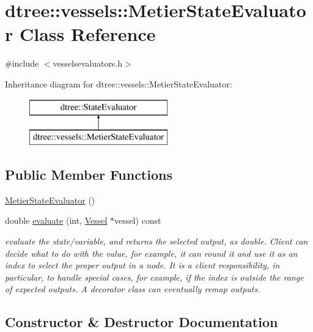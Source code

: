 \hypertarget{classdtree_1_1vessels_1_1_metier_state_evaluator}{}\section{dtree\+::vessels\+::Metier\+State\+Evaluator Class Reference}
\label{classdtree_1_1vessels_1_1_metier_state_evaluator}


{\ttfamily \#include $<$vesselsevaluators.\+h$>$}

Inheritance diagram for dtree\+::vessels\+::Metier\+State\+Evaluator\+:\begin{figure}[H]
\begin{center}
\leavevmode
\includegraphics[height=2.000000cm]{d0/d50/classdtree_1_1vessels_1_1_metier_state_evaluator}
\end{center}
\end{figure}
\subsection*{Public Member Functions}
\begin{DoxyCompactItemize}
\item 
\mbox{\hyperlink{classdtree_1_1vessels_1_1_metier_state_evaluator_aaf895b90d503cdfb6255db69dff999f6}{Metier\+State\+Evaluator}} ()
\item 
double \mbox{\hyperlink{classdtree_1_1vessels_1_1_metier_state_evaluator_acce952a17d43e9bd1a16a2ae2ec7161e}{evaluate}} (int, \mbox{\hyperlink{class_vessel}{Vessel}} $\ast$vessel) const
\begin{DoxyCompactList}\small\item\em evaluate the state/variable, and returns the selected output, as double. Client can decide what to do with the value, for example, it can round it and use it as an index to select the proper output in a node. It is a client responsibility, in particular, to handle special cases, for example, if the index is outside the range of expected outputs. A decorator class can eventually remap outputs. \end{DoxyCompactList}\end{DoxyCompactItemize}


\subsection{Constructor \& Destructor Documentation}
\mbox{\label{classdtree_1_1vessels_1_1_metier_state_evaluator_aaf895b90d503cdfb6255db69dff999f6}} 
